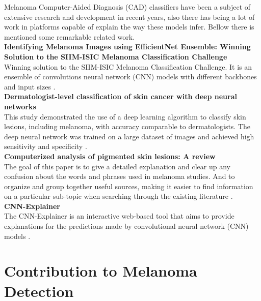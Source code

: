 Melanoma Computer-Aided Diagnosis (CAD) classifiers have been a subject of extensive research and development in recent years, also there has being a lot of work in platforms capable of explain the way these models infer. Bellow there is mentioned some remarkable related work. \\

\vspace{0.5cm}
\textbf{Identifying Melanoma Images using EfficientNet Ensemble: Winning Solution to the SIIM-ISIC Melanoma Classification Challenge} \\

Winning solution to the SIIM-ISIC Melanoma Classification Challenge. It is an ensemble of convolutions neural network (CNN) models with different backbones and input sizes \cite{WinningISIC}.  \\

\vspace{0.5cm}
\textbf{Dermatologist-level classification of skin cancer with deep neural networks} \\

This study demonstrated the use of a deep learning algorithm to classify skin lesions, including melanoma, with accuracy comparable to dermatologists. The deep neural network was trained on a large dataset of images and achieved high sensitivity and specificity \cite{SkinCancerDeepNN}. \\

\vspace{0.5cm}
\textbf{Computerized analysis of pigmented skin lesions: A review}  \\

The goal of this paper is to give a detailed explanation and clear up any confusion about the words and phrases used in melanoma studies. And to organize and group together useful sources, making it easier to find information on a particular sub-topic when searching through the existing literature \cite{MelanomaTopicsReview}. \\

\vspace{0.5cm}
\textbf{CNN-Explainer} \\

The CNN-Explainer is an interactive web-based tool that aims to provide explanations for the predictions made by convolutional neural network (CNN) models \cite{CNNExplainer}.
    
\section{Contribution to Melanoma Detection}

